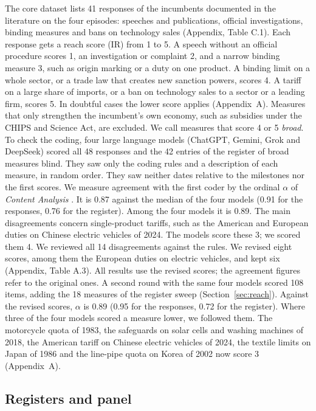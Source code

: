 \documentclass[review,authoryear,12pt]{elsarticle}
\begin{document}
The core dataset lists 41 responses of the incumbents documented in the literature on the four episodes: speeches and publications, official investigations, binding measures and bans on technology sales (Appendix, Table C.1). Each response gets a reach score (IR) from 1 to 5. A speech without an official procedure scores 1, an investigation or complaint 2, and a narrow binding measure 3, such as origin marking or a duty on one product. A binding limit on a whole sector, or a trade law that creates new sanction powers, scores 4. A tariff on a large share of imports, or a ban on technology sales to a sector or a leading firm, scores 5. In doubtful cases the lower score applies (Appendix~A). Measures that only strengthen the incumbent's own economy, such as subsidies under the CHIPS and Science Act, are excluded. We call measures that score 4 or 5 \emph{broad}. To check the coding, four large language models (ChatGPT, Gemini, Grok and DeepSeek) scored all 48 responses and the 42 entries of the register of broad measures blind. They saw only the coding rules and a description of each measure, in random order. They saw neither dates relative to the milestones nor the first scores. We measure agreement with the first coder by the ordinal $\alpha$ of \emph{Content Analysis} \citep{krippendorff2013}. It is 0.87 against the median of the four models (0.91 for the responses, 0.76 for the register). Among the four models it is 0.89. The main disagreements concern single-product tariffs, such as the American and European duties on Chinese electric vehicles of 2024. The models score these 3; we scored them 4. We reviewed all 14 disagreements against the rules. We revised eight scores, among them the European duties on electric vehicles, and kept six (Appendix, Table A.3). All results use the revised scores; the agreement figures refer to the original ones. A second round with the same four models scored 108 items, adding the 18 measures of the register sweep (Section~\ref{sec:reach}). Against the revised scores, $\alpha$ is 0.89 (0.95 for the responses, 0.72 for the register). Where three of the four models scored a measure lower, we followed them. The motorcycle quota of 1983, the safeguards on solar cells and washing machines of 2018, the American tariff on Chinese electric vehicles of 2024, the textile limits on Japan of 1986 and the line-pipe quota on Korea of 2002 now score 3 (Appendix~A).

\subsection{Registers and panel}
\end{document}
